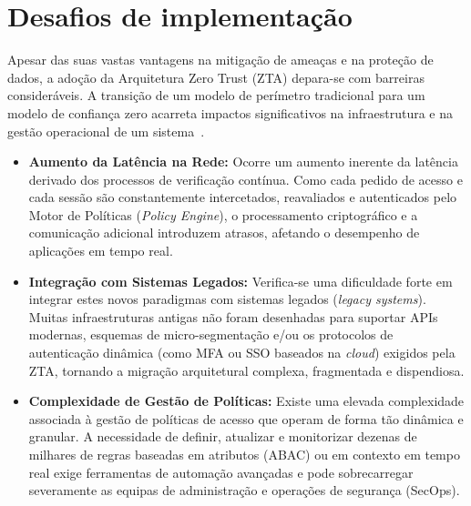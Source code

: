 \documentclass{llncs}
\begin{document}
\section{Desafios de implementação}
Apesar das suas vastas vantagens na mitigação de ameaças e na proteção de dados, a adoção da Arquitetura Zero Trust (ZTA) depara-se com barreiras consideráveis. A transição de um modelo de perímetro tradicional para um modelo de confiança zero acarreta impactos significativos na infraestrutura e na gestão operacional de um sistema~\cite{he2022,dhiman2024}.

\begin{itemize}
    \item \textbf{Aumento da Latência na Rede:} Ocorre um aumento inerente da latência derivado dos processos de verificação contínua. Como cada pedido de acesso e cada sessão são constantemente intercetados, reavaliados e autenticados pelo Motor de Políticas (\textit{Policy Engine}), o processamento criptográfico e a comunicação adicional introduzem atrasos, afetando o desempenho de aplicações em tempo real.
    
    \item \textbf{Integração com Sistemas Legados:} Verifica-se uma dificuldade forte em integrar estes novos paradigmas com sistemas legados (\textit{legacy systems}). Muitas infraestruturas antigas não foram desenhadas para suportar APIs modernas, esquemas de micro-segmentação e/ou os protocolos de autenticação dinâmica (como MFA ou SSO baseados na \textit{cloud}) exigidos pela ZTA, tornando a migração arquitetural complexa, fragmentada e dispendiosa.
    
    \item \textbf{Complexidade de Gestão de Políticas:} Existe uma elevada complexidade associada à gestão de políticas de acesso que operam de forma tão dinâmica e granular. A necessidade de definir, atualizar e monitorizar dezenas de milhares de regras baseadas em atributos (ABAC) ou em contexto em tempo real exige ferramentas de automação avançadas e pode sobrecarregar severamente as equipas de administração e operações de segurança (SecOps).
\end{itemize}
\end{document}
